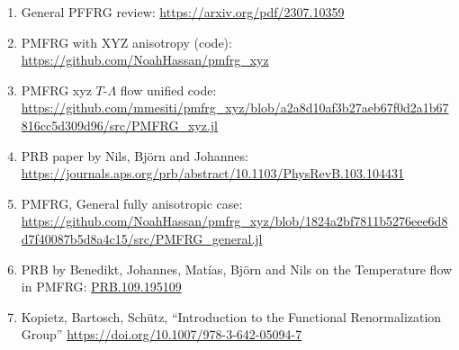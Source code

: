 \documentclass{article}
\begin{document}
\begin{enumerate}
\item General PFFRG review: \href{https://arxiv.org/pdf/2307.10359}{https://arxiv.org/pdf/2307.10359} \label{PFFRGReview}

\item PMFRG with XYZ anisotropy (code): \href{https://github.com/NoahHassan/pmfrg\_xyz}{https://github.com/NoahHassan/pmfrg\_xyz}
\item PMFRG xyz $T$-$\Lambda$ flow unified code: \href{https://github.com/mmesiti/pmfrg\_xyz/blob/a2a8d10af3b27aeb67f0d2a1b67816cc5d309d96/src/PMFRG\_xyz.jl} {https://github.com/mmesiti/pmfrg\_xyz/blob/a2a8d10af3b27aeb67f0d2a1b67816cc5d309d96/src/PMFRG\_xyz.jl} \label{PMFRGXYZTLambda}
\item PRB paper by Nils, Björn and Johannes: \href{https://journals.aps.org/prb/abstract/10.1103/PhysRevB.103.104431}{https://journals.aps.org/prb/abstract/10.1103/PhysRevB.103.104431} \label{PRB103}
\item PMFRG, General fully anisotropic case:
  \href{https://github.com/NoahHassan/pmfrg\_xyz/blob/1824a2bf7811b5276eee6d8d7f40087b5d8a4c15/src/PMFRG\_general.jl}{https://github.com/NoahHassan/pmfrg\_xyz/blob/1824a2bf7811b5276eee6d8d7f40087b5d8a4c15/src/PMFRG\_general.jl} \label{PMFRGFullAniso}

\item PRB by Benedikt, Johannes, Matías,  Björn and Nils on the Temperature flow in PMFRG:
  \href{https://doi.org/10.1103/PhysRevB.109.195109}{PRB.109.195109} \label{TemperatureFlowPaper}

\item Kopietz, Bartosch, Schütz, ``Introduction to the Functional Renormalization Group''
  \href{https://doi.org/10.1007/978-3-642-05094-7}{https://doi.org/10.1007/978-3-642-05094-7} \label{FRGBible}

\end{enumerate}
\end{document}
